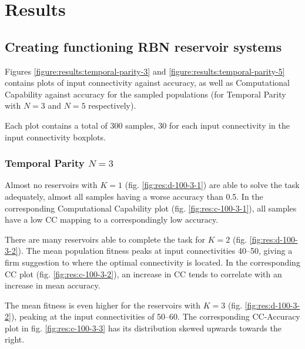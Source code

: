 \section{Results}

\subsection{Creating functioning RBN reservoir systems}

Figures \ref{figure:results:temporal-parity-3} and \ref{figure:results:temporal-parity-5} contains plots of input connectivity against accuracy,
as well as Computational Capability against accuracy for the sampled populations (for Temporal Parity with $N=3$ and $N=5$ respectively).

Each plot contains a total of 300 samples, 30 for each input connectivity in the input connectivity boxplots.

\subsubsection{Temporal Parity $N=3$}

Almost no reservoirs with $K=1$ (fig. \ref{fig:res:d-100-3-1}) are able to solve the task adequately,
almost all samples having a worse accuracy than 0.5.
In the corresponding Computational Capability plot (fig. \ref{fig:res:c-100-3-1}),
all samples have a low CC mapping to a correspondingly low accuracy.

There are many reservoirs able to complete the task for $K=2$ (fig. \ref{fig:res:d-100-3-2}).
The mean population fitness peaks at input connectivities 40–50,
giving a firm suggestion to where the optimal connectivity is located.
In the corresponding CC plot (fig. \ref{fig:res:c-100-3-2}),
an increase in CC tends to correlate with an increase in mean accuracy.

The mean fitness is even higher for the reservoirs with $K=3$ (fig. \ref{fig:res:d-100-3-2}),
peaking at the input connectivities of 50–60.
The corresponding CC-Accuracy plot in fig. \ref{fig:res:c-100-3-3}
has its distribution skewed upwards towards the right.

